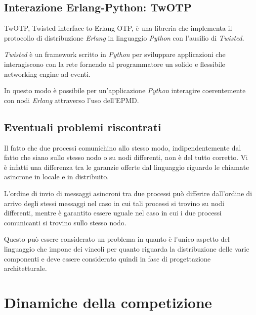 \documentclass[11pt,a4paper]{report}
\begin{document}
\subsection*{Interazione Erlang-Python: TwOTP}
TwOTP, Twisted interface to Erlang OTP, è una libreria che implementa il protocollo di distribuzione \textit{Erlang} in linguaggio \textit{Python} con l'ausilio di \textit{Twisted}.

\textit{Twisted} è un framework scritto in \textit{Python} per sviluppare applicazioni che interagiscono con la rete fornendo al programmatore un solido e flessibile networking engine ad eventi.

In questo modo è possibile per un'applicazione \textit{Python} interagire coerentemente con nodi \textit{Erlang} attraverso l'uso dell'EPMD.

\subsection*{Eventuali problemi riscontrati}
Il fatto che due processi comunichino allo stesso modo, indipendentemente dal fatto che siano sullo stesso nodo o su nodi differenti, non è del tutto corretto. Vi è infatti una differenza tra le garanzie offerte dal linguaggio riguardo le chiamate asincrone in locale e in distribuito.

L'ordine di invio di messaggi asincroni tra due processi può differire dall'ordine di arrivo degli stessi messaggi nel caso in cui tali processi si trovino su nodi differenti, mentre è garantito essere uguale nel caso in cui i due processi comunicanti si trovino sullo stesso nodo.

Questo può essere considerato un problema in quanto è l'unico aspetto del linguaggio che impone dei vincoli per quanto riguarda la distribuzione delle varie componenti e deve essere considerato quindi in fase di progettazione architetturale.
\section{Dinamiche della competizione}
\end{document}
